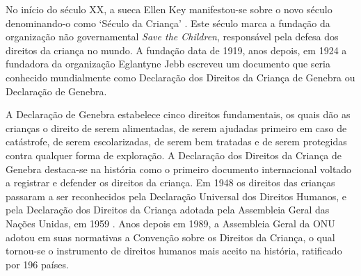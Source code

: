 

No início do século XX, a sueca Ellen Key manifestou-se sobre o novo século denominando-o como `Século da Criança' \cite{sandin1999imagens, dos2015olhares, hayes2002children}. Este século marca a fundação da organização não governamental \textit{Save the Children}, responsável pela defesa dos direitos da criança no mundo. A fundação data de 1919, anos depois, em 1924 a fundadora da organização Eglantyne Jebb escreveu um documento que seria conhecido mundialmente como Declaração dos Direitos da Criança de Genebra ou Declaração de Genebra.

A Declaração de Genebra estabelece cinco direitos fundamentais, os quais dão as crianças o direito de serem alimentadas, de serem ajudadas primeiro em caso de catástrofe, de serem escolarizadas, de serem bem tratadas e de serem protegidas contra qualquer forma de exploração. A Declaração dos Direitos da Criança de Genebra destaca-se na história como o primeiro documento internacional voltado a registrar e defender os direitos da criança. Em 1948 os direitos das crianças passaram a ser reconhecidos pela Declaração Universal dos Direitos Humanos, e pela Declaração dos Direitos da Criança adotada pela Assembleia Geral das Nações Unidas, em 1959 \cite{lelis2014fragmentaccao}. Anos depois em 1989, a Assembleia Geral da ONU adotou em suas normativas a Convenção sobre os Direitos da Criança, o qual tornou-se o instrumento de direitos humanos mais aceito na história, ratificado por 196 países. 

